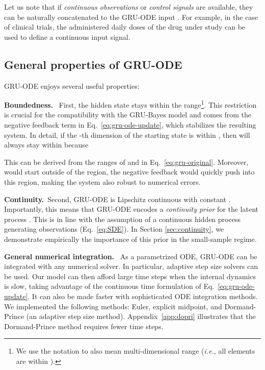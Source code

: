 \documentclass{article}
\begin{document}
Let us note that if \emph{continuous observations} or \emph{control signals} are available, they can be naturally concatenated to the GRU-ODE input .
For example, in the case of clinical trials, the administered daily doses of the drug under study can be used to define a continuous input signal.
\fi



\subsection{General properties of GRU-ODE}
\label{subsec:gru_ode_properties}
GRU-ODE enjoys several useful properties:

\textbf{Boundedness.}~ First, the hidden state  stays within the  range\footnote{We use the notation  to also mean multi-dimensional range (\emph{i.e.}, all elements are within ).}. This restriction is crucial for the compatibility with the GRU-Bayes model and comes from the negative feedback term in Eq.~\ref{eq:gru-ode-update}, which stabilizes the resulting system. 
In detail, if the -th dimension of the starting state  is within , then  will always stay within  because

This can be derived from the ranges of  and  in Eq.~\ref{eq:gru-original}. Moreover, would  start outside of the  region, the negative feedback would quickly push  into this region, making the system also robust to numerical errors.

\textbf{Continuity.}~Second, GRU-ODE is Lipschitz continuous with constant . Importantly, this means that GRU-ODE encodes a \emph{continuity prior} for the latent process . This is in line with the assumption of a continuous hidden process generating observations (Eq.~\ref{eq:SDE}). In Section \ref{sec:continuity}, we demonstrate empirically the importance of this prior in the small-sample regime.

\textbf{General numerical integration.}~ As a parametrized ODE, GRU-ODE can be integrated with any numerical solver. In particular, adaptive step size solvers can be used. Our model can then afford large time steps when the internal dynamics is slow, taking advantage of the continuous time formulation of Eq.~\ref{eq:gru-ode-update}. It can also be made faster with sophisticated ODE integration methods. We implemented the following methods: Euler, explicit midpoint, and Dormand-Prince (an adaptive step size method). Appendix~\ref{app:dopri} illustrates that the Dormand-Prince method requires fewer time steps. 
\end{document}
